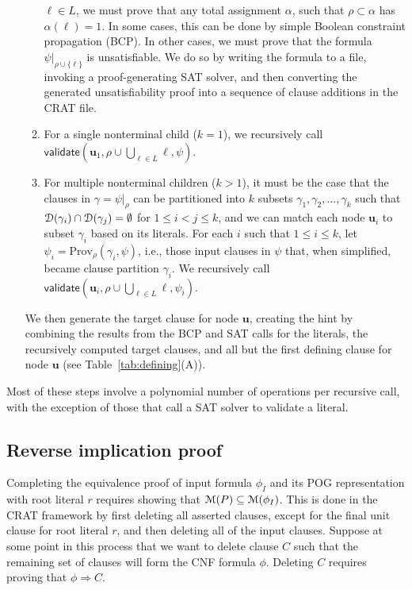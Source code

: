 \documentclass[letterpaper,USenglish,cleveref, autoref, thm-restate]{lipics-v2021}
\newcommand{\obar}[1]{\overline{#1}}
\newcommand{\lit}{\ell}
\newcommand{\dependencyset}{{\cal D}}
\newcommand{\imply}{\Rightarrow}
\newcommand{\passign}{\rho}
\newcommand{\modelset}{{\cal M}}
\newcommand{\validate}{\textsf{validate}}
\newcommand{\prov}{\textrm{Prov}}
\newcommand{\inputformula}{\phi_I}
\newcommand{\makenode}[1]{\mathbf{#1}}
\newcommand{\nodeu}{\makenode{u}}
\newcommand{\simplify}[2]{#1|_{#2}}
\begin{document}
\begin{enumerate}
\begin{enumerate}
  $\lit \in L$, we must prove that any total assignment $\alpha$, such that
  $\passign \subset \alpha$ has $\alpha(\lit) = 1$.  In some
  cases, this can be done by simple Boolean constraint propagation (BCP).
  In other cases, we must prove that the formula
  $\simplify{\psi}{\passign \cup \{\obar{\lit}\}}$ is unsatisfiable.  We
  do so by writing the formula to a file, invoking a proof-generating
  SAT solver, and then converting the generated unsatisfiability proof
  into a sequence of clause additions in the CRAT file.
\item For a single nonterminal child ($k = 1$), we recursively call
  $\validate \left(\nodeu_1, \passign \cup \bigcup_{\lit \in L} \lit, \psi\right)$.
\item For multiple nonterminal children ($k > 1$),
  it must be the case that the clauses in
  $\gamma = \simplify{\psi}{\passign}$ can be partitioned into $k$ subsets
  $\gamma_1, \gamma_2, \ldots, \gamma_k$ such that $\dependencyset(\gamma_i)
  \cap \dependencyset(\gamma_j) = \emptyset$ for $1 \leq i < j \leq k$,
  and we can match each node $\nodeu_i$ to subset $\gamma_i$ based on its
  literals.
  For each $i$ such that $1 \leq i \leq k$, let $\psi_i = \prov_{\passign}(\gamma_i, \psi)$, i.e., those input clauses in $\psi$ that, when simplified, became clause partition $\gamma_i$.
  We recursively call
  $\validate \left(\nodeu_i, \passign \cup \bigcup_{\lit \in L} \lit, \psi_i\right)$.
\end{enumerate}
  We then generate the target clause for node $\nodeu$,
creating the hint by combining the results from the BCP and SAT calls for
  the literals, the recursively computed target clauses, and all but
  the first defining clause for node $\nodeu$
(see Table~\ref{tab:defining}(A)).
\end{enumerate}
Most of these steps involve a polynomial number of
operations per recursive call, with the exception of those that call
a SAT solver to validate a literal.

\subsection{Reverse implication proof}

Completing the equivalence proof of input formula $\inputformula$ and its POG
representation with root literal $r$ requires showing that
$\modelset(P) \subseteq \modelset(\inputformula)$.  This is done in the
CRAT framework by first deleting all asserted clauses, except for the
final unit clause for root literal $r$, and then deleting all of the
input clauses.  Suppose at some point in this process that we want to
delete clause $C$ such that the remaining set of clauses will form the
CNF formula $\phi$.  Deleting $C$ requires proving that
$\phi \imply C$.
\end{document}

